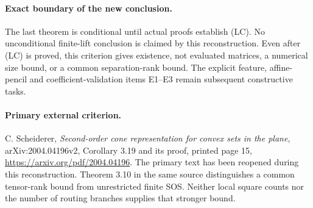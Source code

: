 \paragraph{Exact boundary of the new conclusion.}
The last theorem is conditional until actual proofs establish (LC).
No unconditional finite-lift conclusion is claimed by this reconstruction.
Even after (LC) is proved, this criterion gives existence, not evaluated
matrices, a numerical size bound, or a common separation-rank bound.
The explicit feature, affine-pencil and coefficient-validation items
E1--E3 remain subsequent constructive tasks.

\paragraph{Primary external criterion.}
C. Scheiderer, \emph{Second-order cone representation for convex sets
in the plane}, arXiv:2004.04196v2, Corollary 3.19 and its proof,
printed page 15, \url{https://arxiv.org/pdf/2004.04196}.
The primary text has been reopened during this reconstruction.
Theorem 3.10 in the same source distinguishes a common tensor-rank
bound from unrestricted finite SOS. Neither local square counts nor
the number of routing branches supplies that stronger bound.
